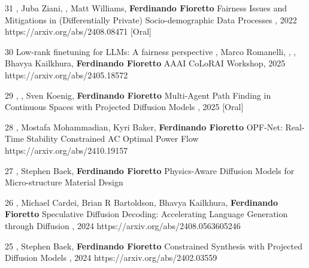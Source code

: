 \begin{pubs}

\wsentryAwd
	{31} 
	{, Juba Ziani, , Matt Williams, {\bf Ferdinando Fioretto}}
	{Fairness Issues and Mitigations in (Differentially Private) Socio-demographic Data Processes}
	{, 2022}
	{https://arxiv.org/abs/2408.08471}
	{[Oral]}%

\wsentry
	{30}
	{Low-rank finetuning for LLMs: A fairness perspective}
	{, Marco Romanelli, , , Bhavya Kailkhura,  {\bf Ferdinando Fioretto}}
	{{\venue AAAI CoLoRAI Workshop}, 2025}
	{https://arxiv.org/abs/2405.18572}


\wsentryAwd
	{29} 
	{, , Sven Koenig, {\bf Ferdinando Fioretto}}
	{Multi-Agent Path Finding in Continuous Spaces with Projected Diffusion Models}
	{, 2025}
	{}
	{[Oral]}

\wsentry
	{28}
	{, Mostafa Mohammadian, Kyri Baker, {\bf Ferdinando Fioretto}}
	{OPF-Net: Real-Time Stability Constrained AC Optimal Power Flow}
	{}
	{https://arxiv.org/abs/2410.19157}

\wsentry
	{27}
	{, Stephen Baek, {\bf Ferdinando Fioretto}}
	{Physics-Aware Diffusion Models for Micro-structure Material Design}
	{}
	{}

\wsentry
	{26}
	{, Michael Cardei, Brian R Bartoldson, Bhavya Kailkhura, {\bf Ferdinando Fioretto}}
	{Speculative Diffusion Decoding: Accelerating Language Generation through Diffusion}
	{, 2024}
	{https://arxiv.org/abs/2408.0563605246}

\wsentry
 	{25}
	{, Stephen Baek, {\bf Ferdinando Fioretto}}
  	{Constrained Synthesis with Projected Diffusion Models}
  	{, 2024}
	{https://arxiv.org/abs/2402.03559}


\end{pubs}
